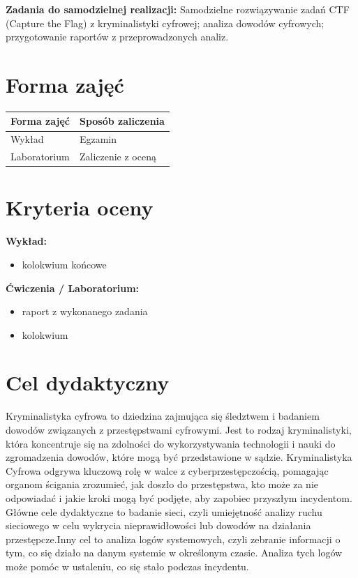 \documentclass[12pt, a4paper]{article}
\newcommand{\thdrule}{\noalign{\global\setlength{\extrarowheight}{0pt}}}
\newcommand{\thdend}{\noalign{\global\setlength{\extrarowheight}{3pt}}}
\begin{document}
\vspace{4pt}
\noindent\textbf{Zadania do samodzielnej realizacji:} Samodzielne rozwiązywanie zadań CTF (Capture the Flag) z kryminalistyki cyfrowej; analiza dowodów cyfrowych; przygotowanie raportów z przeprowadzonych analiz.

\section{Forma zajęć}

\begin{center}
{\scriptsize
\begin{tabular}{m{5cm}m{8cm}}
\thdrule\toprule
\rowcolor{pjatkRed} {\color{white}\textbf{Forma zajęć}} & {\color{white}\textbf{Sposób zaliczenia}} \\
\midrule\thdend
  \rowcolor{tableRowLight} Wykład & Egzamin \\
  \rowcolor{tableRowAlt} Laboratorium & Zaliczenie z oceną \\
\bottomrule
\end{tabular}}
\end{center}

\section{Kryteria oceny}

\textbf{Wykład:}
\begin{itemize}
  \item kolokwium końcowe
\end{itemize}
\vspace{4pt}
\textbf{Ćwiczenia / Laboratorium:}
\begin{itemize}
  \item raport z wykonanego zadania
  \item kolokwium
\end{itemize}


\section{Cel dydaktyczny}

Kryminalistyka cyfrowa to dziedzina zajmująca się śledztwem i badaniem dowodów związanych z przestępstwami cyfrowymi. Jest to rodzaj kryminalistyki, która koncentruje się na zdolności do wykorzystywania technologii i nauki do zgromadzenia dowodów, które mogą być przedstawione w sądzie. Kryminalistyka Cyfrowa odgrywa kluczową rolę w walce z cyberprzestępczością, pomagając organom ścigania zrozumieć, jak doszło do przestępstwa, kto może za nie odpowiadać i jakie kroki mogą być podjęte, aby zapobiec przyszłym incydentom. Główne cele dydaktyczne to badanie sieci, czyli umiejętność analizy ruchu sieciowego w celu wykrycia nieprawidłowości lub dowodów na działania przestępcze.Inny cel to analiza logów systemowych, czyli zebranie informacji o tym, co się działo na danym systemie w określonym czasie. Analiza tych logów może pomóc w ustaleniu, co się stało podczas incydentu.
\end{document}
